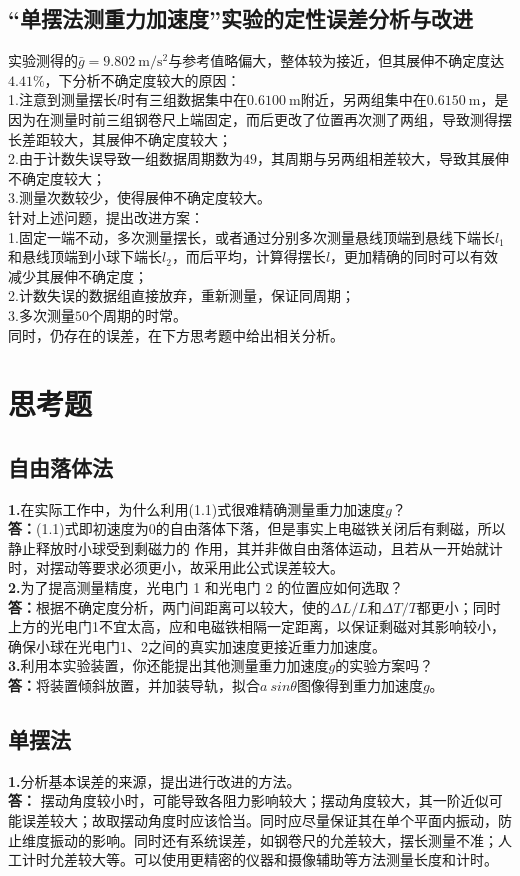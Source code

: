 \documentclass{article}
\def\kong{\hspace*{2em}}
\begin{document}
	\subsection{“单摆法测重力加速度”实验的定性误差分析与改进}
  	\kong 实验测得的$\bar{g}=9.802\ \text{m}/\text{s}^2$与参考值略偏大，整体较为接近，但其展伸不确定度达$4.41\%$，下分析不确定度较大的原因：\\
    \kong 1.注意到测量摆长$l$时有三组数据集中在$0.6100 \ \text{m}$附近，另两组集中在$0.6150 \ \text{m}$，是因为在测量时前三组钢卷尺上端固定，而后更改了位置再次测了两组，导致测得摆长差距较大，其展伸不确定度较大；\\
    \kong 2.由于计数失误导致一组数据周期数为$49$，其周期与另两组相差较大，导致其展伸不确定度较大；\\
    \kong 3.测量次数较少，使得展伸不确定度较大。\\
    \kong 针对上述问题，提出改进方案：\\
    \kong 1.固定一端不动，多次测量摆长，或者通过分别多次测量悬线顶端到悬线下端长$l_1$和悬线顶端到小球下端长$l_2$，而后平均，计算得摆长$l$，更加精确的同时可以有效减少其展伸不确定度；\\
    \kong 2.计数失误的数据组直接放弃，重新测量，保证同周期；\\
    \kong 3.多次测量$50$个周期的时常。\\
    \kong 同时，仍存在的误差，在下方思考题中给出相关分析。\\
\section{思考题}
	\subsection{自由落体法}
  	\kong \textbf{1.}在实际工作中，为什么利用(1.1)式很难精确测量重力加速度$g$？\\
    \kong \textbf{答：}(1.1)式即初速度为$0$的自由落体下落，但是事实上电磁铁关闭后有剩磁，所以静止释放时小球受到剩磁力的
作用，其并非做自由落体运动，且若从一开始就计时，对摆动等要求必须更小，故采用此公式误差较大。\\
		\kong \textbf{2.}为了提高测量精度，光电门 1 和光电门 2 的位置应如何选取？\\
    \kong \textbf{答：}根据不确定度分析，两门间距离可以较大，使的$\Delta L/L$和$\Delta T/T$都更小；同时上方的光电门1不宜太高，应和电磁铁相隔一定距离，以保证剩磁对其影响较小，确保小球在光电门1、2之间的真实加速度更接近重力加速度。\\
    \kong \textbf{3.}利用本实验装置，你还能提出其他测量重力加速度$g$的实验方案吗？\\
    \kong \textbf{答：}将装置倾斜放置，并加装导轨，拟合$a\ sin\theta$图像得到重力加速度$g$。
  \subsection{单摆法}
  	\kong \textbf{1.}分析基本误差的来源，提出进行改进的方法。\\
    \kong \textbf{答：} 摆动角度较小时，可能导致各阻力影响较大；摆动角度较大，其一阶近似可能误差较大；故取摆动角度时应该恰当。同时应尽量保证其在单个平面内振动，防止维度振动的影响。同时还有系统误差，如钢卷尺的允差较大，摆长测量不准；人工计时允差较大等。可以使用更精密的仪器和摄像辅助等方法测量长度和计时。\\
\end{document}
